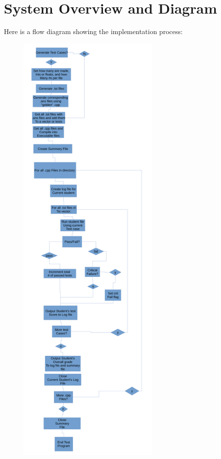 \section{System Overview and Diagram}
Here is a flow diagram showing the implementation process:


\begin{figure}[h]
\centering \includegraphics[width=7cm]{sprint2Algorithm}
\end{figure}

\let\cleardoublepage\clearpage


